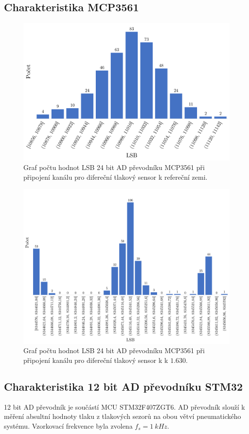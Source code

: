 \subsection{Charakteristika MCP3561}
\begin{figure}[H]
    \caption{Graf počtu hodnot LSB 24 bit AD převodníku MCP3561 při připojení kanálu
        pro difereční tlakový sensor k refereční zemi.}
    \includegraphics[width=1\textwidth]{graphs/mcp_gnd.png}
\end{figure}
\begin{figure}[H]
    \caption{Graf počtu hodnot LSB 24 bit AD převodníku MCP3561 při připojení kanálu
        pro difereční tlakový sensor k k $1.630$.}
    \includegraphics[width=1\textwidth]{graphs/mcp_16.png}
\end{figure}
\subsection{Charakteristika 12 bit AD převodníku STM32}
12 bit AD převodník je součástí MCU STM32F407ZGT6. AD převodník slouží k měření absultní hodnoty tlaku z tlakových sezorů na obou větví pneumatického systému. Vzorkovací frekvence byla zvolena $f_s = 1 \ kHz$.

